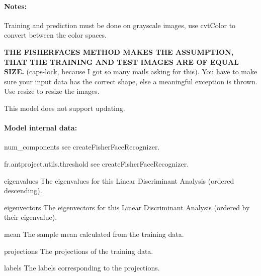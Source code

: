 \paragraph*{Notes\+:}


\begin{DoxyItemize}
\item Training and prediction must be done on grayscale images, use cvt\+Color to convert between the color spaces.
\item {\bfseries T\+HE F\+I\+S\+H\+E\+R\+F\+A\+C\+ES M\+E\+T\+H\+OD M\+A\+K\+ES T\+HE A\+S\+S\+U\+M\+P\+T\+I\+ON, T\+H\+AT T\+HE T\+R\+A\+I\+N\+I\+NG A\+ND T\+E\+ST I\+M\+A\+G\+ES A\+RE OF E\+Q\+U\+AL S\+I\+ZE.} (caps-\/lock, because I got so many mails asking for this). You have to make sure your input data has the correct shape, else a meaningful exception is thrown. Use resize to resize the images.
\item This model does not support updating. 
\end{DoxyItemize}

\paragraph*{Model internal data\+:}


\begin{DoxyItemize}
\item num\+\_\+components see create\+Fisher\+Face\+Recognizer.
\item fr.antproject.utils.threshold see create\+Fisher\+Face\+Recognizer.
\item eigenvalues The eigenvalues for this Linear Discriminant Analysis (ordered descending).
\item eigenvectors The eigenvectors for this Linear Discriminant Analysis (ordered by their eigenvalue).
\item mean The sample mean calculated from the training data.
\item projections The projections of the training data.
\item labels The labels corresponding to the projections. 
\end{DoxyItemize}\mbox{\label{group__face_ga970c161034e055fb56615aadba87ac4e}} 

